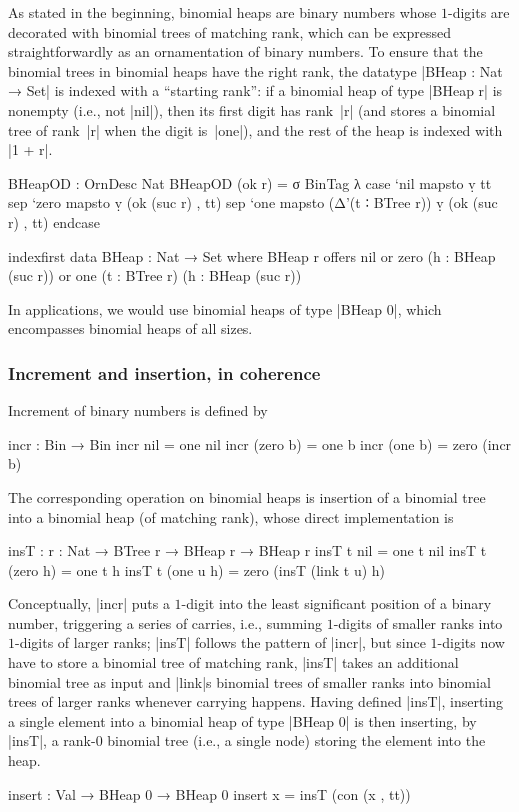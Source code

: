 As stated in the beginning, binomial heaps are binary numbers whose $1$-digits are decorated with binomial trees of matching rank, which can be expressed straightforwardly as an ornamentation of binary numbers.
To ensure that the binomial trees in binomial heaps have the right rank, the datatype |BHeap : Nat → Set| is indexed with a ``starting rank'': if a binomial heap of type |BHeap r| is nonempty (i.e., not |nil|), then its first digit has rank~|r| (and stores a binomial tree of rank~|r| when the digit is~|one|), and the rest of the heap is indexed with |1 + r|.
\begin{code}
BHeapOD : OrnDesc Nat
BHeapOD (ok r) = σ BinTag λ  case  `nil   mapsto  ṿ tt
                             sep   `zero  mapsto  ṿ (ok (suc r) , tt)
                             sep   `one   mapsto  (Δ'(t ∶ BTree r)) ṿ (ok (suc r) , tt) endcase

indexfirst data BHeap : Nat → Set where
  BHeap r  offers  nil
           or      zero  (h : BHeap (suc r))
           or      one   (t : BTree r) (h : BHeap (suc r))
\end{code}
In applications, we would use binomial heaps of type |BHeap 0|, which encompasses binomial heaps of all sizes.

\subsubsection{Increment and insertion, in coherence}
Increment of binary numbers is defined by
\begin{code}
incr : Bin → Bin
incr nil        =  one nil
incr (zero  b)  =  one b
incr (one   b)  =  zero (incr b)
\end{code}
The corresponding operation on binomial heaps is insertion of a binomial tree into a binomial heap (of matching rank), whose direct implementation is
\begin{code}
insT : {r : Nat} → BTree r → BHeap r → BHeap r
insT t nil         = one t nil
insT t (zero   h)  = one t h
insT t (one u  h)  = zero (insT (link t u) h)
\end{code}
Conceptually, |incr| puts a $1$-digit into the least significant position of a binary number, triggering a series of carries, i.e., summing $1$-digits of smaller ranks into $1$-digits of larger ranks; |insT| follows the pattern of |incr|, but since $1$-digits now have to store a binomial tree of matching rank, |insT| takes an additional binomial tree as input and |link|s binomial trees of smaller ranks into binomial trees of larger ranks whenever carrying happens.
Having defined |insT|, inserting a single element into a binomial heap of type |BHeap 0| is then inserting, by |insT|, a rank-$0$ binomial tree (i.e., a single node) storing the element into the heap.
\begin{code}
insert : Val → BHeap 0 → BHeap 0
insert x = insT (con (x , tt))
\end{code}

